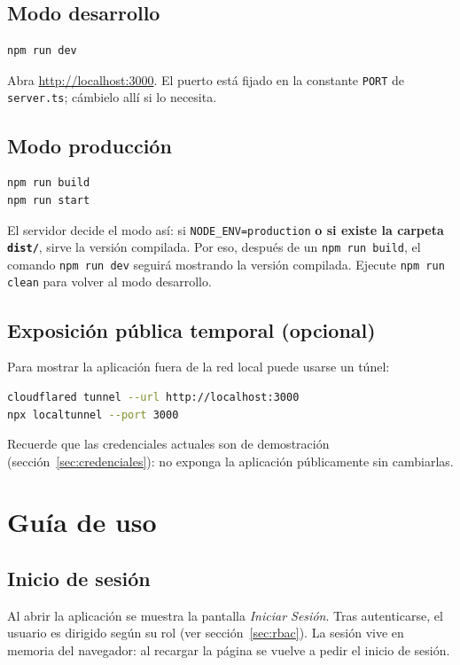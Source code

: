 \documentclass[11pt,a4paper]{article}
\newcommand{\ruta}[1]{\texttt{#1}}
\begin{document}
\subsection{Modo desarrollo}
\begin{lstlisting}[language=bash]
npm run dev
\end{lstlisting}
Abra \url{http://localhost:3000}. El puerto está fijado en la constante
\texttt{PORT} de \ruta{server.ts}; cámbielo allí si lo necesita.

\subsection{Modo producción}
\begin{lstlisting}[language=bash]
npm run build
npm run start
\end{lstlisting}

\begin{aviso}
El servidor decide el modo así: si \texttt{NODE\_ENV=production} \textbf{o si existe la
carpeta \ruta{dist/}}, sirve la versión compilada. Por eso, después de un
\texttt{npm run build}, el comando \texttt{npm run dev} seguirá mostrando la versión
compilada. Ejecute \texttt{npm run clean} para volver al modo desarrollo.
\end{aviso}

\subsection{Exposición pública temporal (opcional)}
Para mostrar la aplicación fuera de la red local puede usarse un túnel:
\begin{lstlisting}[language=bash]
cloudflared tunnel --url http://localhost:3000
npx localtunnel --port 3000
\end{lstlisting}
Recuerde que las credenciales actuales son de demostración (sección~\ref{sec:credenciales}):
no exponga la aplicación públicamente sin cambiarlas.

\section{Guía de uso}

\subsection{Inicio de sesión}
Al abrir la aplicación se muestra la pantalla \emph{Iniciar Sesión}. Tras autenticarse,
el usuario es dirigido según su rol (ver sección~\ref{sec:rbac}). La sesión vive en
memoria del navegador: al recargar la página se vuelve a pedir el inicio de sesión.
\end{document}
